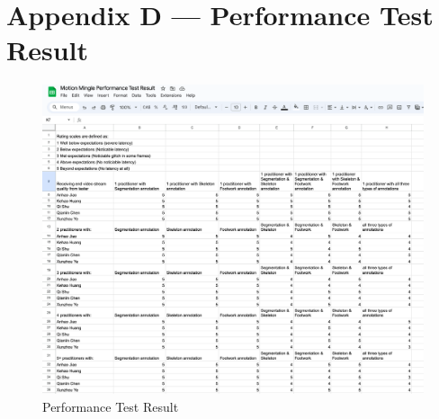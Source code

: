 \documentclass[12pt, titlepage]{article}
\begin{document}
\section*{Appendix D --- Performance Test Result}
\begin{figure}[h]
  \centering
  \includegraphics[width=1.0\linewidth]{performance.png}
  \caption{Performance Test Result}
  \label{fig:performance}
\end{figure}
\end{document}
